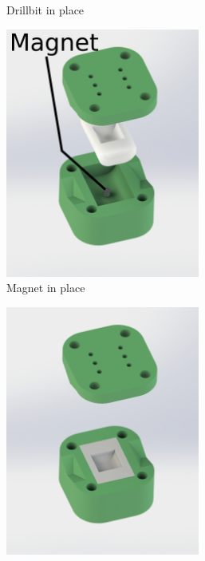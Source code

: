 \begin{figure}
\begin{subfigure}{.3\linewidth}
        \caption{Drillbit in place}
        \label{label:Drillbitinplace}
    \end{subfigure}
    \begin{subfigure}{.3\linewidth}
        \centering
        \includegraphics[width=0.7\textwidth]{Images/mold/siliconout.png}          
        \caption{Magnet in place}
        \label{label:magnetinplace}
    \end{subfigure}
    \begin{subfigure}{.3\linewidth}
        \centering
        \includegraphics[width=0.7\textwidth]{Images/mold/lidoff.png}       

\end{subfigure}
\end{figure}

